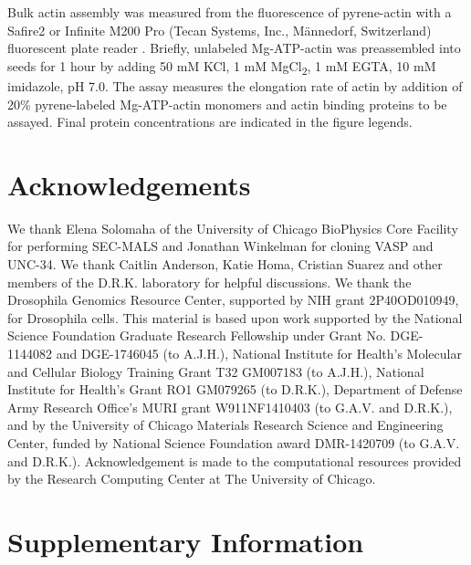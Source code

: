 Bulk actin assembly was measured from the fluorescence of pyrene-actin with a Safire2 or Infinite M200 Pro (Tecan Systems, Inc., M\"annedorf, Switzerland) fluorescent plate reader \citep{neidt_cytokinesis_2008,zimmermann_vitro_2016}. Briefly, unlabeled Mg-ATP-actin was preassembled into seeds for 1 hour by adding 50 mM KCl, 1 mM MgCl\textsubscript{2}, 1 mM EGTA, 10 mM imidazole, pH 7.0. The assay measures the elongation rate of actin by addition of 20\% pyrene-labeled Mg-ATP-actin monomers and actin binding proteins to be assayed. Final protein concentrations are indicated in the figure legends.

\section{Acknowledgements}\label{ch02-acknowledgements}

We thank Elena Solomaha of the University of Chicago BioPhysics Core Facility for performing SEC-MALS and Jonathan Winkelman for cloning VASP and UNC-34. We thank Caitlin Anderson, Katie Homa, Cristian Suarez and other members of the D.R.K. laboratory for helpful discussions. We thank the Drosophila Genomics Resource Center, supported by NIH grant 2P40OD010949, for Drosophila cells. This material is based upon work supported by the National Science Foundation Graduate Research Fellowship under Grant No. DGE-1144082 and DGE-1746045 (to A.J.H.), National Institute for Health's Molecular and Cellular Biology Training Grant T32 GM007183 (to A.J.H.), National Institute for Health's Grant RO1 GM079265 (to D.R.K.), Department of Defense Army Research Office's MURI grant W911NF1410403 (to G.A.V. and D.R.K.), and by the University of Chicago Materials Research Science and Engineering Center, funded by National Science Foundation award DMR-1420709 (to G.A.V. and D.R.K.). Acknowledgement is made to the computational resources provided by the Research Computing Center at The University of Chicago.

\section{Supplementary Information}\label{ch02-si}

